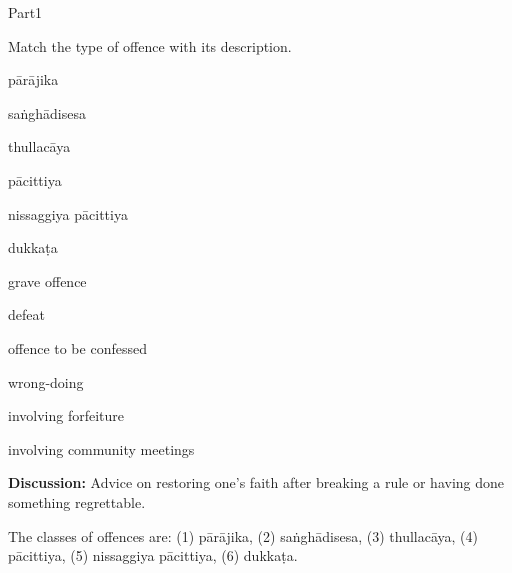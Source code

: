 \documentclass[11pt,oneside]{memoir}
\begin{document}
\begin{exam}{Part1}
\begin{problem}
\end{problem}

\problemDivide

\begin{problem*}

  Match the type of offence with its description.

  \bigskip

  \begin{multicols}{2}

    \begin{parts}

    \item \fillin{2cm}{\ref{parajika}} pārājika
    \item \fillin{2cm}{\ref{sanghadisesa}} saṅghādisesa
    \item \fillin{2cm}{\ref{thullacaya}} thullacāya
    \item \fillin{2cm}{\ref{pacittiya}} pācittiya
    \item \fillin{2cm}{\ref{nissaggiya}} nissaggiya pācittiya
    \item \fillin{2cm}{\ref{dukkata}} dukkaṭa

    \columnbreak

    \bMatchChoices

    \item\label{thullacaya} grave offence
    \item\label{parajika} defeat
    \item\label{pacittiya} offence to be confessed
    \item\label{dukkata} wrong-doing
    \item\label{nissaggiya} involving forfeiture
    \item\label{sanghadisesa} involving community meetings

    \eMatchChoices
      
    \end{parts}
    
  \end{multicols}

  \bigskip

  \textbf{Discussion:} Advice on restoring one's faith after breaking a rule or
  having done something regrettable.

  \begin{solution}
    The classes of offences are: (1) pārājika, (2) saṅghādisesa, (3) thullacāya,
    (4) pācittiya, (5) nissaggiya pācittiya, (6) dukkaṭa.
  \end{solution}


\end{problem*}
\end{exam}
\end{document}
